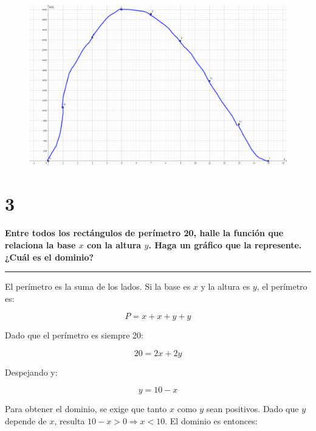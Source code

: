 \documentclass{article}
\begin{document}
\newpage

\begin{figure}[ht]
\caption{}
\includegraphics[scale=0.6]{../img/guide_01/ex_02c.png} 
\centering
\label{fig:2c}
\end{figure}

\section*{3}
\label{sec:3}

\textbf{Entre todos los rectángulos de perímetro 20, halle la función que relaciona la base $x$ con la altura $y$. Haga un gráfico que la represente. ¿Cuál es el dominio?}

\vspace{1em}
\hrule
\vspace{1em}

El perímetro es la suma de los lados. Si la base es $x$ y la altura es $y$, el perímetro es:

\begin{equation}
P = x + x + y + y
\end{equation}

Dado que el perímetro es siempre 20:

\begin{equation}
20 = 2x + 2y
\end{equation}

Despejando y:

\begin{equation}
y = 10 - x
\end{equation}

Para obtener el dominio, se exige que tanto $x$ como $y$ sean positivos. Dado que $y$ depende de $x$, resulta $10 - x > 0 \Rightarrow x < 10$. El dominio es entonces:
\end{document}
